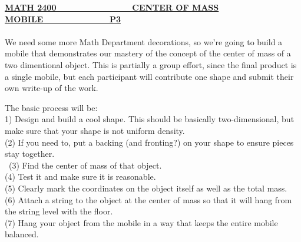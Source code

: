 \documentclass[5pt,a4paper]{article}
\begin{document}
\begin{center}
\textbf{\underline {MATH 2400~~~~~~~~~~~~~~~~CENTER OF MASS MOBILE~~~~~~~~~~~~~~P3}}
\end{center}
\paragraph{}
We need some more Math Department decorations, so we're going to build a mobile that demonstrates our mastery of the concept of the center of mass of a two dimentional object. This is partially a group effort, since the final product is a single mobile, but each participant will contribute one shape and submit their own write-up of the work. \\
\begin{enumerate}
The basic process will be: \\
1) Design and build a cool shape. This should be basically two-dimensional, but make sure that your shape is not uniform density. \\ 
(2) If you need to, put a backing (and fronting?) on your shape to ensure pieces stay together. \\\ 
(3) Find the center of mass of that object. \\ 
(4) Test it and make sure it is reasonable. \\ 
(5) Clearly mark the coordinates on the object itself as well as the total mass. \\ 
(6) Attach a string to the object at the center of mass so that it will hang from the string level with the floor. \\ 
(7) Hang your object from the mobile in a way that keeps the entire mobile balanced.

\end{enumerate}
\end{document}
